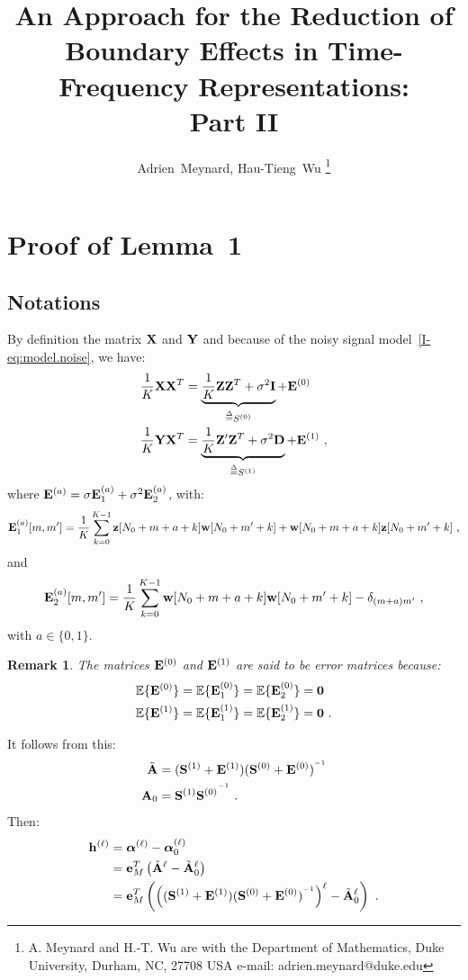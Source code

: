 \documentclass[journal,onecolumn]{IEEEtran}
\title{An Approach for the Reduction of Boundary Effects in Time-Frequency Representations:\\ Part II}
\author{Adrien~Meynard, %
        Hau-Tieng~Wu
\thanks{A. Meynard and H.-T. Wu are with the Department
of Mathematics, Duke University, Durham,
NC, 27708 USA e-mail: adrien.meynard@duke.edu}}
\newtheorem{remark}{Remark}
\begin{document}
\maketitle


\section{Proof of Lemma~1}
\label{ap:lm.error}

\subsection{Notations}
By definition the matrix ${\mathbf X}$ and ${\mathbf Y}$ and because of the noisy signal model~\eqref{I-eq:model.noise}, we have:
\begin{align}
\dfrac1K{\mathbf X}{\mathbf X}^T &= \underbrace{\dfrac1K{\mathbf Z}{\mathbf Z}^T+\sigma^2{\mathbf I}}_{\overset{\Delta}{=} S^{(0)}} + {\mathbf E}^{(0)} \\
\dfrac1K{\mathbf Y}{\mathbf X}^T &= \underbrace{\dfrac1K{\mathbf Z}'{\mathbf Z}^T +\sigma^2{\mathbf D}}_{\overset{\Delta}{=} S^{(1)}}+ {\mathbf E}^{(1)} \ ,
\end{align}
where ${\mathbf E}^{(a)} = \sigma{\mathbf E}_1^{(a)} + \sigma^2{\mathbf E}_2^{(a)}$, with:
\[
{\mathbf E}_1^{(a)}[m,m'] = \dfrac1K\sum_{k=0}^{K-1} {\mathbf z}[N_0+m+a+k]{\mathbf w}[N_0+m'+k] + {\mathbf w}[N_0+m+a+k]{\mathbf z}[N_0+m'+k]\ ,
\]
and
\[
{\mathbf E}_2^{(a)}[m,m'] =  \dfrac1K\sum_{k=0}^{K-1} {\mathbf w}[N_0+m+a+k]{\mathbf w}[N_0+m'+k] - \delta_{(m+a)m'}\ ,
\]
with $a\in\{0,1\}$.

\begin{remark}
The matrices ${\mathbf E}^{(0)}$ and ${\mathbf E}^{(1)}$ are said to be error matrices because:
\begin{align*}
{\mathbb E}\{{\mathbf E}^{(0)}\} &= {\mathbb E}\{{\mathbf E}_1^{(0)}\} = {\mathbb E}\{{\mathbf E}_2^{(0)}\} = \boldsymbol{0} \\
{\mathbb E}\{{\mathbf E}^{(1)}\} &= {\mathbb E}\{{\mathbf E}_1^{(1)}\} = {\mathbb E}\{{\mathbf E}_2^{(1)}\} = \boldsymbol{0}\ .
\end{align*}
\end{remark}

It follows from this:
\begin{align*}
\tilde{{\mathbf A}} &= ({\mathbf S}^{(1)}+{\mathbf E}^{(1)})({\mathbf S}^{(0)}+{\mathbf E}^{(0)})^{^{-1}} \\
{\mathbf A}_0 &={\mathbf S}^{(1)}{{\mathbf S}^{(0)}}^{^{-1}}\ .
\end{align*}
Then:
\begin{align}
\nonumber
\bh^{(\ell)} &= \balpha^{(\ell)} - \balpha^{(\ell)}_0 \\
\nonumber
&= \be_M^T\left(\tilde\bA^\ell-\tilde\bA_0^\ell\right) \\
&= \be_M^T\left(\left((\bS^{(1)}+\bE^{(1)})(\bS^{(0)}+\bE^{(0)})^\inv\right)^\ell- \tilde\bA_0^\ell\right)\ .
\label{eq:error.vec}
\end{align}
\end{document}
